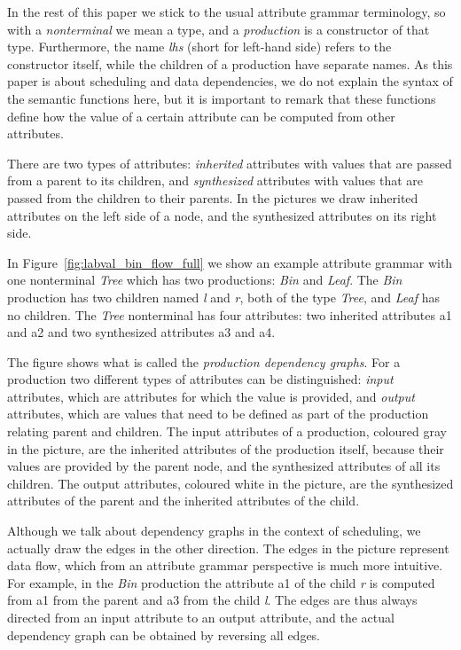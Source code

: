 \documentclass{llncs}
\newcommand{\figref}[1]{Figure~\ref{#1}}
\begin{document}
In the rest of this paper we stick to the usual attribute grammar terminology, so with a \emph{nonterminal} we mean a type, and a \emph{production} is a constructor of that type. Furthermore, the name \emph{lhs} (short for left-hand side) refers to the constructor itself, while the children of a production have separate names. As this paper is about scheduling and data dependencies, we do not explain the syntax of the semantic functions here, but it is important to remark that these functions define how the value of a certain attribute can be computed from other attributes.

There are two types of attributes: \emph{inherited} attributes with values that are passed from a parent to its children, and \emph{synthesized} attributes with values that are passed from the children to their parents. In the pictures we draw inherited attributes on the left side of a node, and the synthesized attributes on its right side.


In \figref{fig:labval_bin_flow_full} we show an example attribute grammar with one nonterminal \emph{Tree} which has two productions: \emph{Bin} and \emph{Leaf}. The \emph{Bin} production has two children named \emph{l} and \emph{r}, both of the type \emph{Tree}, and \emph{Leaf} has no children. The \emph{Tree} nonterminal has four attributes: two inherited attributes a1 and a2 and two synthesized attributes a3 and a4.

The figure shows what is called the \emph{production dependency graphs}. For a production two different types of attributes can be distinguished: \emph{input} attributes, which are attributes for which the value is provided, and \emph{output} attributes, which are values that need to be defined as part of the production relating parent and children. The input attributes of a production, coloured gray in the picture, are the inherited attributes of the production itself, because their values are provided by the parent node, and the synthesized attributes of all its children. The output attributes, coloured white in the picture, are the synthesized attributes of the parent and the inherited attributes of the child.

Although we talk about dependency graphs in the context of scheduling, we actually draw the edges in the other direction. The edges in the picture represent data flow, which from an attribute grammar perspective is much more intuitive. For example, in the \emph{Bin} production the attribute a1 of the child \emph{r} is computed from a1 from the parent and a3 from the child \emph{l}. The edges are thus always directed from an input attribute to an output attribute, and the actual dependency graph can be obtained by reversing all edges.
\end{document}
